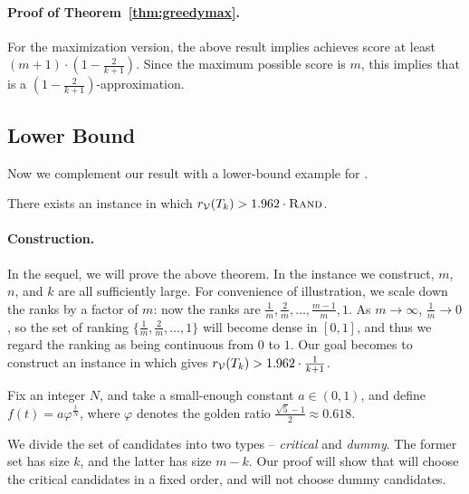 \paragraph{Proof of Theorem~\ref{thm:greedymax}.} For the maximization version, the above result implies \g{} achieves score at least $(m+1) \cdot \left(1- \frac{2}{k+1} \right)$. Since the maximum possible score is $m$, this implies that \g{} is a $\left( 1 - \frac{2}{k+1} \right)$-approximation.

\subsection{Lower Bound}
\label{sec:greedy_lb}
Now we complement our result with a lower-bound example for \g.

\begin{theorem}
\label{thm:greedy_lb}
There exists an instance in which $r_{\mathcal{V}}(T_k) > 1.962\cdot {\normalfont\textsc{Rand}}$.
\end{theorem}


\iffalse

\paragraph{Construction.} In the sequel, we will prove the above theorem. In the instance we construct, $m$, $n$, and $k$ are all sufficiently large. For convenience of illustration, we scale down the ranks by a factor of $m$: now the ranks are $\frac{1}{m}, \frac{2}{m}, \ldots, \frac{m - 1}{m}, 1$. As $m \to \infty$, $\frac{1}{m} \to 0$, so the set of ranking $\{\frac{1}{m}, \frac{2}{m}, \ldots, 1\}$ will become dense in $[0, 1]$, and thus we regard the ranking as being continuous from $0$ to $1$. Our goal becomes to construct an instance in which \g{} gives $r_{\mathcal{V}}(T_k) > 1.962 \cdot \frac{1}{k + 1}$.

Fix an integer $N$, and take a small-enough constant $a \in (0, 1)$, and define $f(t) = a\varphi^{\frac{t}{N}}$, where $\varphi$ denotes the golden ratio $\frac{\sqrt{5} - 1}{2} \approx 0.618$. 

We divide the set of candidates into two types -- {\em critical} and {\em dummy}. The former set has size $k$, and the latter has size $m-k$. Our proof will show that \g{} will choose the critical candidates in a fixed order, and will not choose dummy candidates. 

